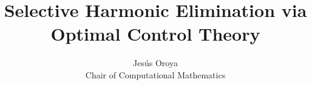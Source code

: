 \documentclass[a4paper]{article}
\title{Selective Harmonic Elimination via Optimal Control Theory}
\author{Jesús Oroya \\ Chair of Computational Mathematics}
\begin{document}
\maketitle

\begin{abstract}
    
\end{abstract}





\newpage
\appendix






\end{document}
